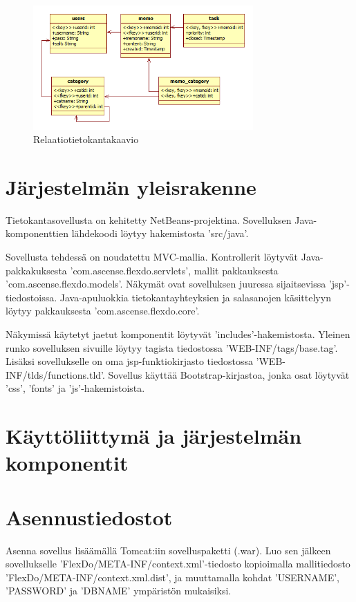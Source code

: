 ﻿\documentclass[finnish]{report}
\begin{document}
\begin{figure}[H]
\centering
\includegraphics[width=0.75\textwidth]{relaatiotietokantakaavio}
\caption{Relaatiotietokantakaavio}
\end{figure}


\chapter{Järjestelmän yleisrakenne}

Tietokantasovellusta on kehitetty NetBeans-projektina. Sovelluksen Java-komponenttien lähdekoodi löytyy hakemistosta 'src/java'.

Sovellusta tehdessä on noudatettu MVC-mallia. Kontrollerit löytyvät Java-pakkakuksesta 'com.ascense.flexdo.servlets', mallit pakkauksesta 'com.ascense.flexdo.models'. Näkymät ovat sovelluksen juuressa sijaitsevissa 'jsp'-tiedostoissa. Java-apuluokkia tietokantayhteyksien ja salasanojen käsittelyyn löytyy pakkauksesta 'com.ascense.flexdo.core'.

Näkymissä käytetyt jaetut komponentit löytyvät 'includes'-hakemistosta. Yleinen runko sovelluksen sivuille löytyy tagista tiedostossa 'WEB-INF/tags/base.tag'. Lisäksi sovellukselle on oma jsp-funktiokirjasto tiedostossa 'WEB-INF/tlds/functions.tld'. Sovellus käyttää Bootstrap-kirjastoa, jonka osat löytyvät 'css', 'fonts' ja 'js'-hakemistoista.


\chapter{Käyttöliittymä ja järjestelmän komponentit}



\chapter{Asennustiedostot}

Asenna sovellus lisäämällä Tomcat:iin sovelluspaketti (.war). Luo sen jälkeen sovellukselle 'FlexDo/META-INF/context.xml'-tiedosto kopioimalla mallitiedosto 'FlexDo/META-INF/context.xml.dist', ja muuttamalla kohdat 'USERNAME', 'PASSWORD' ja 'DBNAME' ympäristön mukaisiksi.
\end{document}

